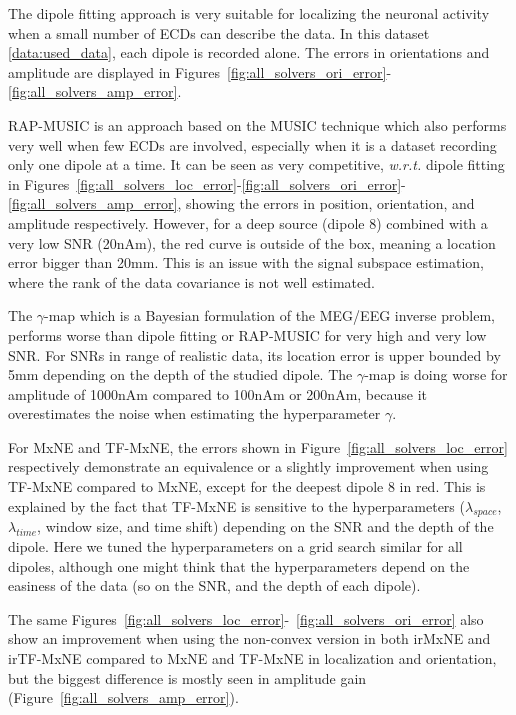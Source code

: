 The dipole fitting approach is very suitable for localizing the neuronal activity when a small number of \ac{ECD}s can describe the data. In this dataset \ref{data:used_data}, each dipole is recorded alone. The errors in orientations and amplitude are displayed in Figures~\ref{fig:all_solvers_ori_error}-\ref{fig:all_solvers_amp_error}.

RAP-MUSIC is an approach based on the MUSIC technique which also performs very well when few ECDs are involved, especially when it is a dataset recording only one dipole at a time. It can be seen as very competitive, \textit{w.r.t.} dipole fitting in Figures~\ref{fig:all_solvers_loc_error}-\ref{fig:all_solvers_ori_error}-\ref{fig:all_solvers_amp_error}, showing the errors in position, orientation, and amplitude respectively. However, for a deep source (dipole 8) combined with a very low SNR (20nAm), the red curve is outside of the box, meaning a location error bigger than 20mm. This is an issue with the signal subspace estimation, where the rank of the data covariance is not well estimated.

The $\gamma$-map which is a Bayesian formulation of the MEG/EEG inverse problem,  performs worse than dipole fitting or RAP-MUSIC for very high and very low SNR. For SNRs in range of realistic data, its location error is upper bounded by 5mm depending on the depth of the studied dipole. The $\gamma$-map is doing worse for amplitude of 1000nAm compared to 100nAm or 200nAm, because it overestimates the noise when estimating the hyperparameter $\gamma$.

For MxNE and TF-MxNE, the errors shown in Figure~\ref{fig:all_solvers_loc_error} respectively demonstrate an equivalence or a slightly improvement when using TF-MxNE compared to MxNE, except for the deepest dipole 8 in red. This is explained by the fact that TF-MxNE is sensitive to the hyperparameters ($\lambda_{space}$, $\lambda_{time}$, window size, and time shift) depending on the SNR and the depth of the dipole. Here we tuned the hyperparameters on a grid search similar for all dipoles, although one might think that the hyperparameters depend on the easiness of the data (so on the SNR, and the depth of each dipole).

The same Figures~\ref{fig:all_solvers_loc_error}-~\ref{fig:all_solvers_ori_error} also show an improvement when using the non-convex version in both irMxNE and irTF-MxNE compared to MxNE and TF-MxNE in localization and orientation, but the biggest difference is mostly seen in amplitude gain (Figure~\ref{fig:all_solvers_amp_error}).

